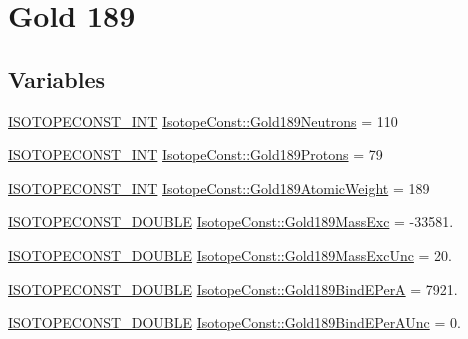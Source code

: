 \hypertarget{group___isotope_const-_gold-_au189}{}\section{Gold 189}
\label{group___isotope_const-_gold-_au189}
\subsection*{Variables}
\begin{DoxyCompactItemize}
\item 
\mbox{\hyperlink{group___isotope_const-_macros_ga5f18360b3e99483a35c32d789e62621c}{I\+S\+O\+T\+O\+P\+E\+C\+O\+N\+S\+T\+\_\+\+I\+NT}} \mbox{\hyperlink{group___isotope_const-_gold-_au189_ga24ac421d2bdfdb4f4e7780909c8bacd4}{Isotope\+Const\+::\+Gold189\+Neutrons}} = 110
\item 
\mbox{\hyperlink{group___isotope_const-_macros_ga5f18360b3e99483a35c32d789e62621c}{I\+S\+O\+T\+O\+P\+E\+C\+O\+N\+S\+T\+\_\+\+I\+NT}} \mbox{\hyperlink{group___isotope_const-_gold-_au189_ga14fae94583d6a87fb711b3193a135f66}{Isotope\+Const\+::\+Gold189\+Protons}} = 79
\item 
\mbox{\hyperlink{group___isotope_const-_macros_ga5f18360b3e99483a35c32d789e62621c}{I\+S\+O\+T\+O\+P\+E\+C\+O\+N\+S\+T\+\_\+\+I\+NT}} \mbox{\hyperlink{group___isotope_const-_gold-_au189_ga30e16791d895a615cbacadacdf54fc28}{Isotope\+Const\+::\+Gold189\+Atomic\+Weight}} = 189
\item 
\mbox{\hyperlink{group___isotope_const-_macros_ga8f45a7272ce02c0b4c65c44636ed719a}{I\+S\+O\+T\+O\+P\+E\+C\+O\+N\+S\+T\+\_\+\+D\+O\+U\+B\+LE}} \mbox{\hyperlink{group___isotope_const-_gold-_au189_ga8e19f1c5969b437f111df8d36c027747}{Isotope\+Const\+::\+Gold189\+Mass\+Exc}} = -\/33581.
\item 
\mbox{\hyperlink{group___isotope_const-_macros_ga8f45a7272ce02c0b4c65c44636ed719a}{I\+S\+O\+T\+O\+P\+E\+C\+O\+N\+S\+T\+\_\+\+D\+O\+U\+B\+LE}} \mbox{\hyperlink{group___isotope_const-_gold-_au189_ga318b309193036a5c73f63d6404fe769b}{Isotope\+Const\+::\+Gold189\+Mass\+Exc\+Unc}} = 20.
\item 
\mbox{\hyperlink{group___isotope_const-_macros_ga8f45a7272ce02c0b4c65c44636ed719a}{I\+S\+O\+T\+O\+P\+E\+C\+O\+N\+S\+T\+\_\+\+D\+O\+U\+B\+LE}} \mbox{\hyperlink{group___isotope_const-_gold-_au189_ga2e48ce7e8389cd2b6e9bbc4b29b95156}{Isotope\+Const\+::\+Gold189\+Bind\+E\+PerA}} = 7921.
\item 
\mbox{\hyperlink{group___isotope_const-_macros_ga8f45a7272ce02c0b4c65c44636ed719a}{I\+S\+O\+T\+O\+P\+E\+C\+O\+N\+S\+T\+\_\+\+D\+O\+U\+B\+LE}} \mbox{\hyperlink{group___isotope_const-_gold-_au189_gae165682d87958aec2707d20d886dcfab}{Isotope\+Const\+::\+Gold189\+Bind\+E\+Per\+A\+Unc}} = 0.

\end{DoxyCompactItemize}
